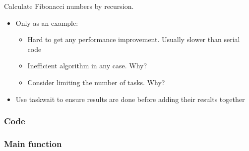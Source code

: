 Calculate Fibonacci numbers by recursion.

\begin{itemize}
\itemsep1pt\parskip0pt
\item
  Only as an example:

  \begin{itemize}
  \itemsep1pt\parskip0pt
  \item
    Hard to get any performance improvement. Usually slower than serial
    code
  \item
    Inefficient algorithm in any case. Why?
  \item
    Consider limiting the number of tasks. Why?
  \end{itemize}
\item
  Use taskwait to ensure results are done before adding their results
  together
\end{itemize}

\subsubsection{Code}\label{code-1}

\begin{Shaded}
\begin{Highlighting}[]


  
\NormalTok{\{}
     \NormalTok{)}
         
     
     
      \NormalTok{;}
    \NormalTok{\{}
        \NormalTok{);}
    \NormalTok{\}}
    \NormalTok{\{}
       \NormalTok{);}
    \NormalTok{\}}
    
     
\NormalTok{\}}
\end{Highlighting}
\end{Shaded}

\subsubsection{Main function}\label{main-function}

